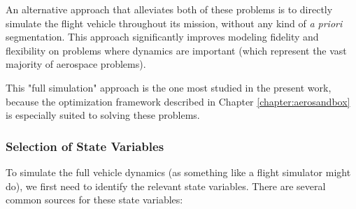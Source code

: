 An alternative approach that alleviates both of these problems is to directly simulate the flight vehicle throughout its mission, without any kind of \textit{a priori} segmentation. This approach significantly improves modeling fidelity and flexibility on problems where dynamics are important (which represent the vast majority of aerospace problems).

This "full simulation" approach is the one most studied in the present work, because the optimization framework described in Chapter \ref{chapter:aerosandbox} is especially suited to solving these problems.

\subsubsection{Selection of State Variables}

To simulate the full vehicle dynamics (as something like a flight simulator might do), we first need to identify the relevant state variables. There are several common sources for these state variables:

